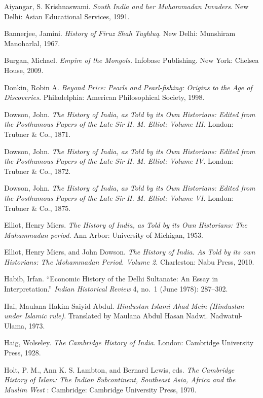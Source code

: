 \begin{thebibliography}{99}
\itemsep=1.1pt
 Aiyangar, S. Krishnaswami.  \textit{South India and her Muhammadan Invaders}. New Delhi: Asian Educational Services, 1991. 

 Bannerjee, Jamini. \textit{History of Firuz Shah Tughluq}. New Delhi: Munshiram Manoharlal, 1967. 

 Burgan, Michael. \textit{ Empire of the Mongols.} Infobase Publishing. New York: Chelsea House, 2009. 

 Donkin, Robin A. \textit{Beyond Price: Pearls and Pearl-fishing: Origins to the Age of Discoveries.} Philadelphia: American Philosophical Society, 1998.

 Dowson, John. \textit{The History of India, as Told by its Own Historians: Edited from the Posthumous Papers of the Late Sir H. M. Elliot: Volume III.} London: Trubner \& Co., 1871.

 Dowson, John. \textit{The History of India, as Told by its Own Historians: Edited from the Posthumous Papers of the Late Sir H. M. Elliot: Volume IV.} London: Trubner \& Co., 1872.

 Dowson, John. \textit{The History of India, as Told by its Own Historians: Edited from the Posthumous Papers of the Late Sir H. M. Elliot: Volume VI.} London: Trubner \& Co., 1875.

 Elliot, Henry Miers. \textit{The History of India, as Told by its Own Historians: The Muhammadan period.} Ann Arbor: University of Michigan, 1953.

 Elliot, Henry Miers, and John Dowson. \textit{The History of India. As Told by its own Historians: The Mohammadan Period. Volume 2.} Charleston: Nabu Press, 2010.

 Habib, Irfan. “Economic History of the Delhi Sultanate: An Essay in Interpretation.” \textit{Indian Historical Review} 4, no.\ 1 (June 1978): 287--302.

 Hai, Maulana Hakim Saiyid Abdul. \textit{Hindustan Islami Ahad Mein (Hindustan under Islamic rule)}. Translated by Maulana Abdul Hasan Nadwi. Nadwatul-Ulama, 1973.

 Haig, Wolseley. \textit{The Cambridge History of India}. London: Cambridge University Press, 1928. 

 Holt, P. M., Ann K. S. Lambton, and Bernard Lewis, eds. \textit{The Cambridge History of Islam: The Indian Subcontinent, Southeast Asia, Africa and the Muslim West} : Cambridge: Cambridge University Press, 1970. 


\end{thebibliography}
